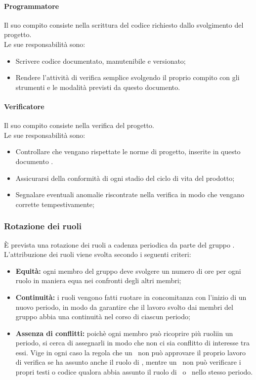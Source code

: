       \paragraph{Programmatore}
        Il suo compito consiste nella scrittura del codice richiesto dallo svolgimento del progetto.\\
        Le sue responsabilità sono:
        \begin{itemize}
          \item Scrivere codice documentato, manutenibile e versionato;
          \item Rendere l'attività di verifica semplice svolgendo il proprio compito con gli strumenti e le modalità previsti da questo documento.
        \end{itemize}

      \paragraph{Verificatore}
        Il suo compito consiste nella verifica del progetto.\\
        Le sue responsabilità sono:
        \begin{itemize}
          \item Controllare che vengano rispettate le norme di progetto, inserite in questo documento \docNameVersionNdP.
          \item Assicurarsi della conformità di ogni stadio del ciclo di vita del prodotto;
          \item Segnalare eventuali anomalie riscontrate nella verifica in modo che vengano corrette tempestivamente;
        \end{itemize}

    \subsubsection{Rotazione dei ruoli}
      È prevista una rotazione dei ruoli a cadenza periodica da parte del gruppo \groupName.\\
      L'attribuzione dei ruoli viene svolta secondo i seguenti criteri:
      \begin{itemize}
        \item \textbf{Equità:} ogni membro del gruppo deve svolgere un numero di ore per ogni ruolo in maniera equa nei confronti degli altri membri;
        \item \textbf{Continuità:} i ruoli vengono fatti ruotare in concomitanza con l'inizio di un nuovo periodo, in modo da garantire che il lavoro svolto dai membri del gruppo abbia una continuità nel corso di ciascun periodo;
        \item \textbf{Assenza di conflitti:} poichè ogni membro può ricoprire più ruoliin un periodo, si cerca di assegnarli in modo che non ci sia conflitto di interesse tra essi. Vige in ogni caso la regola che un \roleProjectManager\ non può approvare il proprio lavoro di verifica se ha assunto anche il ruolo di \roleVerifier, mentre un \roleVerifier\ non può verificare i propri testi o codice qualora abbia assunto il ruolo di \roleAnalyst\ o \roleProgrammer\ nello stesso periodo.
      \end{itemize}


